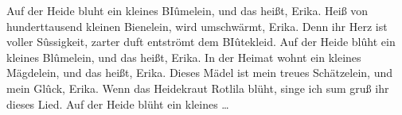 \beginverse*
Auf der Heide bluht ein kleines BIûmelein,
und das heißt, Erika.
Heiß von hunderttausend kleinen Bienelein,
wird umschwärmt, Erika.
Denn ihr Herz ist voller Sûssigkeit,
zarter duft entströmt dem BIûtekleid.
Auf der Heide blûht ein kleines Blûmelein,
und das heißt, Erika.
\endverse
\beginverse*
In der Heimat wohnt ein kleines Mägdelein,
und das heißt, Erika.
Dieses Mädel ist mein treues Schätzelein,
und mein Glûck, Erika.
Wenn das Heidekraut Rotlila blüht,
singe ich sum gruß ihr dieses Lied.
Auf der Heide blüht ein kleines …
\endverse
\endsong